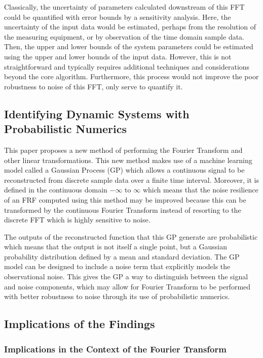 \documentclass[12pt]{article}
\begin{document}
    Classically, the uncertainty of parameters calculated downstream of this FFT could be quantified with error bounds by a sensitivity analysis.
    Here, the uncertainty of the input data would be estimated, perhaps from the resolution of the measuring equipment, or by observation of the time domain sample data.
    Then, the upper and lower bounds of the system parameters could be estimated using the upper and lower bounds of the input data.
    However, this is not straightforward and typically requires additional techniques and considerations beyond the core algorithm.
    Furthermore, this process would not improve the poor robustness to noise of this FFT, only serve to quantify it.

    \subsection{Identifying Dynamic Systems with Probabilistic Numerics}
    This paper proposes a new method of performing the Fourier Transform and other linear transformations.
    This new method makes use of a machine learning model called a Gaussian Process (GP) which allows a continuous signal to be reconstructed from discrete sample data over a finite time interval.
    Moreover, it is defined in the continuous domain $-\infty \text{ to } \infty$ which means that the noise resilience of an FRF computed using this method may be improved because this can be transformed by the continuous Fourier Transform instead of resorting to the discrete FFT which is highly sensitive to noise.

    The outputs of the reconstructed function that this GP generate are probabilistic which means that the output is not itself a single point, but a Gaussian probability distribution defined by a mean and standard deviation.
    The GP model can be designed to include a noise term that explicitly models the observational noise.
    This gives the GP a way to distinguish between the signal and noise components, which may allow for Fourier Transform to be performed with better robustness to noise through its use of probabilistic numerics.

    \subsection{Implications of the Findings}

    \subsubsection{Implications in the Context of the Fourier Transform}
\end{document}
